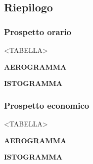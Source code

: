 \subsection{Riepilogo}

\subsubsection{Prospetto orario}

<TABELLA>


\textbf{AEROGRAMMA}


\textbf{ISTOGRAMMA}

\subsubsection{Prospetto economico}

<TABELLA>


\textbf{AEROGRAMMA}


\textbf{ISTOGRAMMA}


